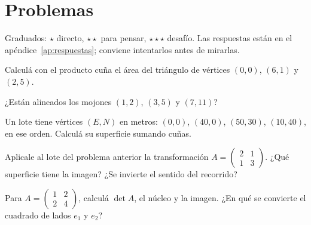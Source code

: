 \section{Problemas}\label{sec:problemas-06}

Graduados: \({\star}\) directo, \({\star}{\star}\) para pensar, \({\star}{\star}{\star}\) desafío. Las respuestas están en el apéndice~\ref{ap:respuestas}; conviene intentarlos antes de mirarlas.

\begin{problema}[\({\star}\)]\label{pb:06-1}
Calculá con el producto cuña el área del triángulo de vértices \((0,0)\), \((6,1)\) y \((2,5)\).
\end{problema}

\begin{problema}[\({\star}\)]\label{pb:06-2}
¿Están alineados los mojones \((1,2)\), \((3,5)\) y \((7,11)\)?
\end{problema}

\begin{problema}[\({\star}{\star}\)]\label{pb:06-3}
Un lote tiene vértices \((E,N)\) en metros: \((0,0)\), \((40,0)\), \((50,30)\), \((10,40)\), en ese orden. Calculá su superficie sumando cuñas.
\end{problema}

\begin{problema}[\({\star}{\star}\)]\label{pb:06-4}
Aplicale al lote del problema anterior la transformación \(A=\begin{pmatrix}2&1\\1&3\end{pmatrix}\). ¿Qué superficie tiene la imagen? ¿Se invierte el sentido del recorrido?
\end{problema}

\begin{problema}[\({\star}{\star}{\star}\)]\label{pb:06-5}
Para \(A=\begin{pmatrix}1&2\\2&4\end{pmatrix}\), calculá \(\det A\), el núcleo y la imagen. ¿En qué se convierte el cuadrado de lados \(e_1\) y \(e_2\)?
\end{problema}
